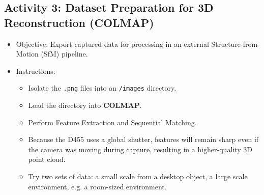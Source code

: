 \documentclass{article}
\begin{document}
\subsection*{Activity 3: Dataset Preparation for 3D Reconstruction (COLMAP)}

\begin{itemize} 
\item Objective: Export captured data for processing in an external Structure-from-Motion (SfM) pipeline. 
\item Instructions: \begin{itemize} 
\item Isolate the \texttt{.png} files into an \texttt{/images} directory. 
\item Load the directory into \textbf{COLMAP}. 
\item Perform Feature Extraction and Sequential Matching. 
\item Because the D455 uses a global shutter, features will remain sharp even if the camera was moving during capture, resulting in a higher-quality 3D point cloud. 
\item Try two sets of data: a small scale from a desktop object, a large scale environment, e.g. a room-sized environment.
\end{itemize} 
\end{itemize}
\end{document}

